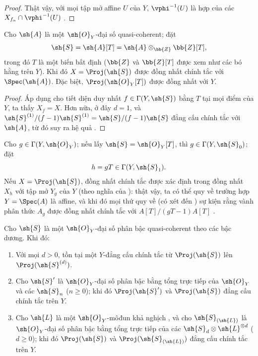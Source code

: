 \documentclass[oneside,10pt]{amsart}
\renewcommand{\geq}{\geqslant}
\newcommand{\oldpage}[2][]{\marginnote{\normalfont\footnotesize\textbf{#1}~|~#2}\ignorespaces}
\let\EGAOriginalLabel\label
\renewcommand{\label}[1]{\phantomsection\EGAOriginalLabel{#1}}
\begin{document}
\begin{proof}
Thật vậy, với mọi tập mở affine $U$ của $Y$, $\vphi^{-1}(U)$ là hợp của các $X_{f_\alpha}\cap\vphi^{-1}(U)$ .
\end{proof}

\begin{corollary}[3.1.7]
\label{II.3.1.7}
Cho $\sh{A}$ là một $\sh{O}_Y$-đại số quasi-coherent;
đặt
\[
  \sh{S}=\sh{A}[T]=\sh{A}\otimes_{\bb{Z}}\bb{Z}[T],
\]
trong đó $T$ là một biến bất định ($\bb{Z}$ và $\bb{Z}[T]$ được xem như các bó hằng trên $Y$).
Khi đó $X=\Proj(\sh{S})$ được đồng nhất chính tắc với $\Spec(\sh{A})$.
Đặc biệt, $\Proj(\sh{O}_Y[T])$ được đồng nhất với $Y$.
\end{corollary}

\begin{proof}
Áp dụng  cho tiết diện duy nhất $f\in\Gamma(Y,\sh{S})$ bằng $T$ tại mọi điểm của $Y$, ta thấy $X_f=X$.
Hơn nữa, ở đây $d=1$, và $\sh{S}^{(1)}/(f-1)\sh{S}^{(1)}=\sh{S}/(f-1)\sh{S}$ đẳng cấu chính tắc với $\sh{A}$, từ đó suy ra hệ quả .
\end{proof}

Cho $g\in\Gamma(Y,\sh{O}_Y)$;
nếu lấy $\sh{S}=\sh{O}_Y[T]$, thì $g\in\Gamma(Y,\sh{S}_0)$;
đặt
\[
  h=gT\in\Gamma(Y,\sh{S}_1).
\]
Nếu $X=\Proj(\sh{S})$, đồng nhất chính tắc được xác định trong  đồng nhất $X_h$ với tập mở $Y_g$ của $Y$ (theo nghĩa của ):
thật vậy, ta có thể quy về trường hợp $Y=\Spec(A)$ là affine, và khi đó mọi thứ quy về (có xét đến ) sự kiện rằng vành phân thức $A_g$ được đồng nhất chính tắc với $A[T]/(gT-1)A[T]$ .

\begin{proposition}[3.1.8]
\label{II.3.1.8}
Cho $\sh{S}$ là một $\sh{O}_Y$-đại số phân bậc quasi-coherent theo các bậc dương.
Khi đó:
\begin{enumerate}
  \item[(i)] Với mọi $d>0$, tồn tại một $Y$-đẳng cấu chính tắc từ $\Proj(\sh{S})$ lên $\Proj(\sh{S}^{(d)})$.
\oldpage[II]{52}
  \item[(ii)] Cho $\sh{S}'$ là $\sh{O}_Y$-đại số phân bậc bằng tổng trực tiếp của $\sh{O}_Y$ và các $\sh{S}_n$ ($n\geq0$);
    khi đó $\Proj(\sh{S}')$ và $\Proj(\sh{S})$ đẳng cấu chính tắc trên $Y$.
  \item[(iii)] Cho $\sh{L}$ là một $\sh{O}_Y$-môđun khả nghịch , và cho $\sh{S}_{(\sh{L})}$ là $\sh{O}_Y$-đại số phân bậc bằng tổng trực tiếp của các $\sh{S}_d\otimes\sh{L}^{\otimes d}$ ($d\geq0$);
    khi đó $\Proj(\sh{S})$ và $\Proj(\sh{S}_{(\sh{L})})$ đẳng cấu chính tắc trên $Y$.
\end{enumerate}
\end{proposition}
\end{document}
